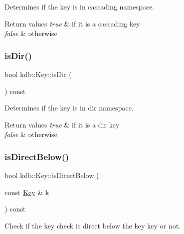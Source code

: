 Determines if the key is in cascading namespace. 


\begin{DoxyRetVals}{Return values}
{\em true} & if it is a cascading key \\
\hline
{\em false} & otherwise \\
\hline
\end{DoxyRetVals}
\mbox{\label{classkdb_1_1Key_a0c60f261479e4e21cc5e9acd76c0d26b}} 
\subsubsection{\texorpdfstring{isDir()}{isDir()}}
{\footnotesize\ttfamily bool kdb\+::\+Key\+::is\+Dir (\begin{DoxyParamCaption}{ }\end{DoxyParamCaption}) const\hspace{0.3cm}{\ttfamily [inline]}}



Determines if the key is in dir namespace. 


\begin{DoxyRetVals}{Return values}
{\em true} & if it is a dir key \\
\hline
{\em false} & otherwise \\
\hline
\end{DoxyRetVals}
\mbox{\label{classkdb_1_1Key_a6b7ce3736c89225445b7cc49d0e62bbe}} 
\subsubsection{\texorpdfstring{isDirectBelow()}{isDirectBelow()}}
{\footnotesize\ttfamily bool kdb\+::\+Key\+::is\+Direct\+Below (\begin{DoxyParamCaption}\item[{const \mbox{\hyperlink{classkdb_1_1Key}{Key}} \&}]{k }\end{DoxyParamCaption}) const\hspace{0.3cm}{\ttfamily [inline]}}



Check if the key check is direct below the key key or not. 


